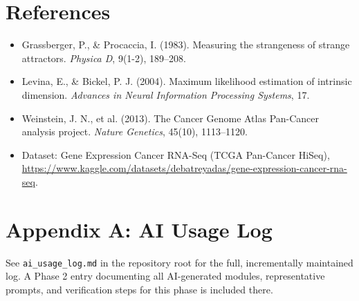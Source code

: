 \documentclass[11pt]{article}
\begin{document}
\section{References}

\begin{itemize}
\item Grassberger, P., \& Procaccia, I. (1983). Measuring the strangeness
of strange attractors. \emph{Physica D}, 9(1-2), 189--208.
\item Levina, E., \& Bickel, P. J. (2004). Maximum likelihood estimation
of intrinsic dimension. \emph{Advances in Neural Information Processing
Systems}, 17.
\item Weinstein, J. N., et al. (2013). The Cancer Genome Atlas Pan-Cancer
analysis project. \emph{Nature Genetics}, 45(10), 1113--1120.
\item Dataset: Gene Expression Cancer RNA-Seq (TCGA Pan-Cancer HiSeq),
\url{https://www.kaggle.com/datasets/debatreyadas/gene-expression-cancer-rna-seq}.
\end{itemize}

\appendix
\section{Appendix A: AI Usage Log}
See \texttt{ai\_usage\_log.md} in the repository root for the full,
incrementally maintained log. A Phase 2 entry documenting all
AI-generated modules, representative prompts, and verification steps for
this phase is included there.
\end{document}
